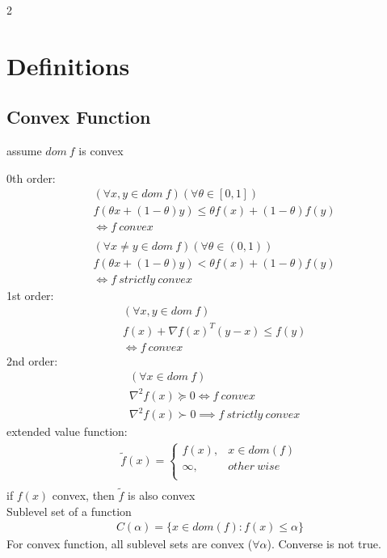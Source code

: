 \documentclass[8pt]{extarticle}
\begin{document}
\begin{multicols*}{2}
  \vfill\null
  \columnbreak
  \vfill\null
  \columnbreak

  \section{Definitions}

  \subsection{Convex Function}
  assume $dom\ f$ is convex
  
  0th order:
  \begin{align*}
    &(\forall x,y \in dom\ f) (\forall \theta \in [0,1])\\
    &f(\theta x +(1-\theta) y) \leq \theta f(x) + (1-\theta) f(y)\\
    &\iff f\ convex\\
    \\
    &(\forall x \neq y \in dom\ f) (\forall \theta \in (0,1))\\
    &f(\theta x +(1-\theta) y) < \theta f(x) + (1-\theta) f(y)\\
    &\iff f\ strictly\ convex
  \end{align*}
  1st order:
  \begin{align*}
    &(\forall x,y \in dom\ f)\\
    &f(x) + \nabla f(x)^T (y-x) \leq f(y)\\
    &\iff f\ convex
  \end{align*}
  2nd order:
  \begin{align*}
    &(\forall x \in dom\ f)\\
    &\nabla^2 f(x) \succeq 0 \iff f\ convex\\
    &\nabla^2 f(x) \succ 0 \implies f\ strictly\ convex
  \end{align*}
  extended value function:
  \begin{align*}
    \tilde{f}(x) = \begin{cases}
      f(x), & x \in dom(f)\\
      \infty, & other\ wise\\
    \end{cases}\\
  \end{align*}
  if $f(x)$ convex, then $\tilde{f}$ is also convex\\

  Sublevel set of a function
  \begin{align*}
    C(\alpha) = \{ x \in dom(f): f(x) \leq \alpha \}
  \end{align*}
  For convex function, all sublevel sets are convex ($\forall \alpha$). Converse is not true.\\
  

\end{multicols*}
\end{document}
